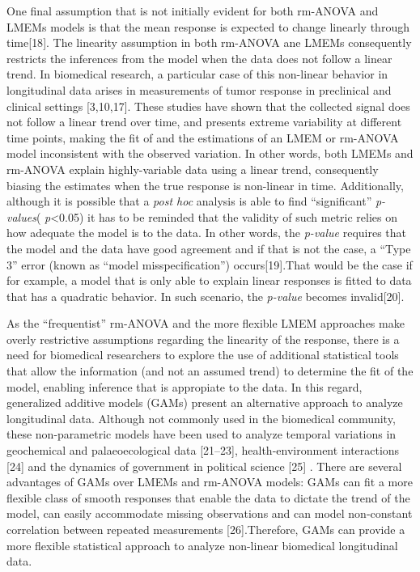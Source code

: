 \documentclass[
]{article}
\begin{document}
One final assumption that is not initially evident for both rm-ANOVA and LMEMs models is that the mean response is expected to change linearly through time{[}18{]}. The linearity assumption in both rm-ANOVA ane LMEMs consequently restricts the inferences from the model when the data does not follow a linear trend. In biomedical research, a particular case of this non-linear behavior in longitudinal data arises in measurements of tumor response in preclinical and clinical settings {[}3,10,17{]}. These studies have shown that the collected signal does not follow a linear trend over time, and presents extreme variability at different time points, making the fit of and the estimations of an LMEM or rm-ANOVA model inconsistent with the observed variation. In other words, both LMEMs and rm-ANOVA explain highly-variable data using a linear trend, consequently biasing the estimates when the true response is non-linear in time.
Additionally, although it is possible that a \emph{post hoc} analysis is able to find ``significant'' \emph{p-values}( \emph{p}\textless0.05) it has to be reminded that the validity of such metric relies on how adequate the model is to the data. In other words, the \emph{p-value} requires that the model and the data have good agreement and if that is not the case, a ``Type 3'' error (known as ``model misspecification'') occurs{[}19{]}.That would be the case if for example, a model that is only able to explain linear responses is fitted to data that has a quadratic behavior. In such scenario, the \emph{p-value} becomes invalid{[}20{]}.

As the ``frequentist'' rm-ANOVA and the more flexible LMEM approaches make overly restrictive assumptions regarding the linearity of the response, there is a need for biomedical researchers to explore the use of additional statistical tools that allow the information (and not an assumed trend) to determine the fit of the model, enabling inference that is appropiate to the data.
In this regard, generalized additive models (GAMs) present an alternative approach to analyze longitudinal data. Although not commonly used in the biomedical community, these non-parametric models have been used to analyze temporal variations in geochemical and palaeoecological data {[}21--23{]}, health-environment interactions {[}24{]} and the dynamics of government in political science {[}25{]} . There are several advantages of GAMs over LMEMs and rm-ANOVA models: GAMs can fit a more flexible class of smooth responses that enable the data to dictate the trend of the model, can easily accommodate missing observations and can model non-constant correlation between repeated measurements {[}26{]}.Therefore, GAMs can provide a more flexible statistical approach to analyze non-linear biomedical longitudinal data.
\end{document}
